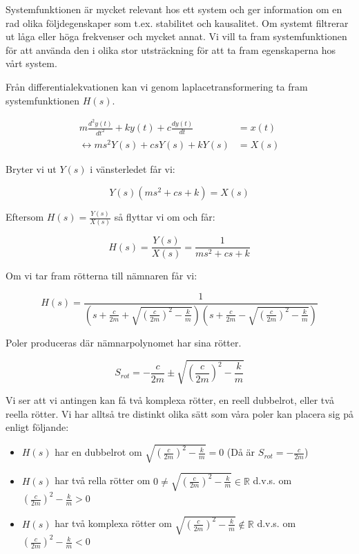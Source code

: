 \documentclass[10pt,a4paper]{article}
\begin{document}
Systemfunktionen är mycket relevant hos ett system och ger information om en rad olika följdegenskaper som t.ex. stabilitet och kausalitet. Om systemt filtrerar ut låga eller höga frekvenser och mycket annat. Vi vill ta fram systemfunktionen för att använda den i olika stor utsträckning för att ta fram egenskaperna hos vårt system.

Från differentialekvationen kan vi genom laplacetransformering ta fram systemfunktionen $H(s)$.

\begin{equation}
\begin{split}
 m\frac{d^2y(t)}{dt^2} + k  y(t) + c\frac{dy(t)}{dt} & = x(t) \\ \leftrightarrow m  s^2  Y(s) + c  s  Y(s) + k  Y(s) & = X(s)
\end{split}
\end{equation}

Bryter vi ut $Y(s)$ i vänsterledet får vi:

\begin{equation}
Y(s)(m  s^2 + c  s + k) = X(s)
\end{equation}

Eftersom $H(s) = \frac{Y(s)}{X(s)}$ så flyttar vi om och får:

\begin{equation}
H(s) = \frac{Y(s)}{X(s)} = \frac{1}{m s^2 + c  s + k}
\end{equation}

Om vi tar fram rötterna till nämnaren får vi:

\begin{equation}
H(s)= \frac{1}{(s + \frac{c}{2 m} + \sqrt{ (\frac{c}{2  m})^2 - \frac{k}{m}}) (s + \frac{c}{2  m} - \sqrt{ (\frac{c}{2  m})^2 - \frac{k}{m}})}
\end{equation}

Poler produceras där nämnarpolynomet har sina rötter.

\begin{equation}
S_{rot}=-\frac{c}{2m} \pm \sqrt{(\frac{c}{2m})^2-\frac{k}{m}}
\end{equation}

Vi ser att vi antingen kan få två komplexa rötter, en reell dubbelrot, eller två reella rötter. Vi har alltså tre distinkt olika sätt som våra poler kan placera sig på enligt följande:
\begin{itemize}

\item $H(s)$ har en dubbelrot om $\sqrt{(\frac{c}{2m})^2-\frac{k}{m}}=0$ (Då är $S_{rot}=-\frac{c}{2m}$)


\item $H(s)$ har två rella rötter om $0\neq\sqrt{(\frac{c}{2m})^2-\frac{k}{m}}\in \mathbb{R}$ \newline d.v.s. om $(\frac{c}{2m})^2-\frac{k}{m}>0$


\item $H(s)$ har två komplexa rötter om $\sqrt{(\frac{c}{2m})^2-\frac{k}{m}}\notin \mathbb{R}$ \newline d.v.s. om $(\frac{c}{2m})^2-\frac{k}{m}<0$

\end{itemize}
\end{document}
